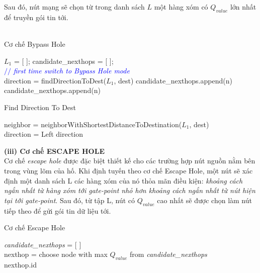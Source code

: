 \documentclass[12pt]{report}
\begin{document}
Sau đó, nút mạng sẽ chọn từ trong danh sách $ L $ một hàng xóm có $Q_{value}$ lớn nhất để truyền gói tin tới.\\ \\
\begin{algorithm}[H]
\setcounter{AlgoLine}{0}
\caption{Cơ chế Bypass Hole}\label{bypasshole}
$L_{1}$ = [ ]; candidate\_nexthops = [ ];\\
\textcolor{blue}{$//$ \textit{first time switch to Bypass Hole mode}}\\
 {
	direction = findDirectionToDest($L_{1}$, dest)
}
 {
 {
	 {
		 {
			candidate\_nexthops.append(n)
		}
	}
}
 {
	 {
		 {
			candidate\_nexthops.append(n)
		}
	}
}
}
\end{algorithm}
\pagebreak
\begin{algorithm}[H]
\setcounter{AlgoLine}{0}
\caption{Find Direction To Dest}
	neighbor = neighborWithShortestDistanceToDestination($L_{1}$, dest)\\
	 {
		direction = Left
	} 
\Return direction
\end{algorithm}
\textbf{(iii) Cơ chế ESCAPE HOLE}\\
Cơ chế \textit{escape hole} được đặc biệt thiết kế cho các trường hợp nút nguồn nằm bên trong vùng lõm của hố.
Khi định tuyến theo cơ chế Escape Hole, một nút sẽ xác định một danh sách L các hàng xóm của nó thỏa mãn điều kiện: \textit{khoảng cách ngắn nhất từ hàng xóm tới gate-point nhỏ hơn khoảng cách ngắn nhất từ nút hiện tại tới gate-point}. Sau đó, từ tập L, nút có $Q_{value}$ cao nhất sẽ được chọn làm nút tiếp theo để gửi gói tin dữ liệu tới.
\begin{center}
\begin{algorithm}[H]
\setcounter{AlgoLine}{0}
\caption{Cơ chế Escape Hole}\label{escapehole}
\textit{candidate\_nexthops} = [ ]\\
nexthop = choose node with max \textit{$Q_{value}$} from \textit{candidate\_nexthops}\\
\Return nexthop.id
\end{algorithm}
\end{center}
\end{document}

